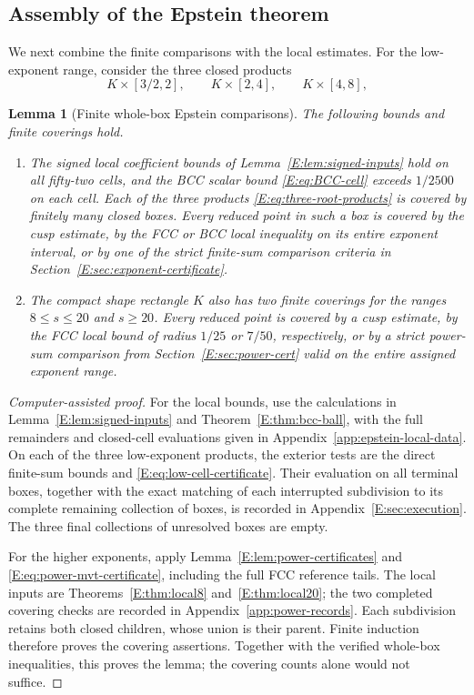 \documentclass[reqno,english]{amsart}
\newtheorem{lemma}[theorem]{Lemma}
\theoremstyle{definition}
\newtheorem{open problem}[theorem]{Open Problem}
\theoremstyle{remark}
\theoremstyle{plain}
\numberwithin{equation}{section}
\begin{document}
\subsection{Assembly of the Epstein theorem}\label{E:sec:assembly}\label{sec:finite-comparisons}\label{app:comparison-lemmas}
We next combine the finite comparisons with the local estimates.
For the low-exponent range, consider the three closed products
\begin{equation}
 K\times[3/2,2],\qquad K\times[2,4],\qquad K\times[4,8],
 \label{E:eq:three-root-products}
\end{equation}
\begin{lemma}[Finite whole-box Epstein comparisons]\label{hyp:epstein}
The following bounds and finite coverings hold.
\begin{enumerate}[label=\textup{(\roman*)},leftmargin=2em]
\item The signed local coefficient bounds of
Lemma~\ref{E:lem:signed-inputs} hold on all fifty-two cells, and the BCC
scalar bound \eqref{E:eq:BCC-cell} exceeds $1/2500$ on each cell.
Each of the three products \eqref{E:eq:three-root-products} is covered
by finitely many closed boxes. Every reduced point in such a box is
covered by the cusp estimate, by the FCC or BCC local inequality on its
entire exponent interval, or by one of the strict finite-sum comparison
criteria in Section~\ref{E:sec:exponent-certificate}.
\item The compact shape rectangle $K$ also has two finite coverings
for the ranges $8\le s\le20$ and $s\ge20$. Every reduced point is
covered by a cusp estimate, by the FCC local bound of radius $1/25$ or
$7/50$, respectively, or by a strict power-sum comparison from
Section~\ref{E:sec:power-cert} valid on the entire assigned exponent
range.
\end{enumerate}
\end{lemma}
\begin{proof}[Computer-assisted proof]
For the local bounds, use the calculations in
Lemma~\ref{E:lem:signed-inputs} and Theorem~\ref{E:thm:bcc-ball},
with the full remainders and closed-cell evaluations given in
Appendix~\ref{app:epstein-local-data}. On each of the three
low-exponent products, the exterior tests are the direct finite-sum
bounds and \eqref{E:eq:low-cell-certificate}. Their evaluation on
all terminal boxes, together with the exact matching of each
interrupted subdivision to its complete remaining collection of boxes,
is recorded in Appendix~\ref{E:sec:execution}. The three final
collections of unresolved boxes are empty.

For the higher exponents, apply
Lemma~\ref{E:lem:power-certificates} and
\eqref{E:eq:power-mvt-certificate}, including the full FCC reference
tails. The local inputs are Theorems~\ref{E:thm:local8}
and~\ref{E:thm:local20}; the two completed covering checks are
recorded in Appendix~\ref{app:power-records}. Each subdivision
retains both closed children, whose union is their parent. Finite
induction therefore proves the covering assertions. Together with
the verified whole-box inequalities, this proves the lemma; the
covering counts alone would not suffice.
\end{proof}
\end{document}
